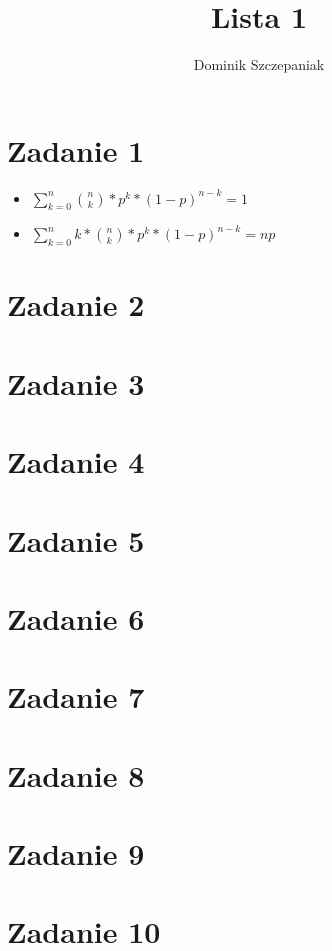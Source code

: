 \documentclass[12pt]{article}
\title{Lista 1}
\author{Dominik Szczepaniak}
\begin{document}
\maketitle
\bgroup\obeylines

\section{Zadanie 1}
\begin{itemize}
    \item  $\sum_{k=0}^n \binom{n}{k} * p^k * (1-p)^{n-k} = 1$
    \item  $\sum_{k=0}^n k * \binom{n}{k} * p^k * (1-p)^{n-k} = np$
\end{itemize}
\section{Zadanie 2}

\section{Zadanie 3}

\section{Zadanie 4}

\section{Zadanie 5}

\section{Zadanie 6}

\section{Zadanie 7}

\section{Zadanie 8}

\section{Zadanie 9}

\section{Zadanie 10}

\egroup
\end{document}
